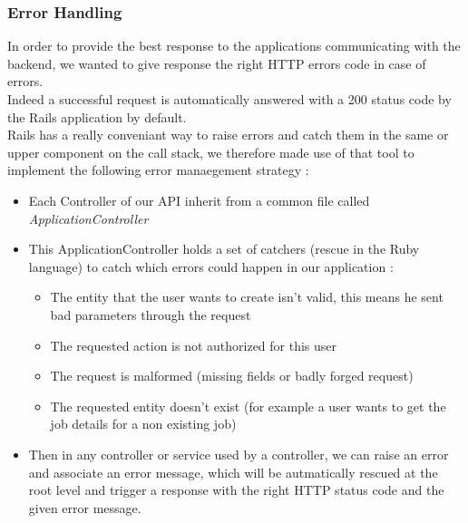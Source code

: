 \documentclass{eplmastersthesis}
\begin{document}
        \subsubsection{Error Handling}

          In order to provide the best response to the applications
          communicating with the backend, we wanted to give response
          the right HTTP errors code in case of errors.\\

          Indeed a successful request is automatically answered with a 200
          status code by the Rails application by default.\\
          Rails has a really conveniant way to raise errors and catch them
          in the same or upper component on the call stack, we therefore
          made use of that tool to implement the following error manaegement
          strategy :

          \begin{itemize}
            \item Each Controller of our API inherit from a common file
            called \textit{ApplicationController}
            \item This ApplicationController holds a set of catchers (rescue
            in the Ruby language) to catch which errors could happen in our
            application :
              \begin{itemize}
                \item The entity that the user wants to create isn't valid, this
                means he sent bad parameters through the request
                \item The requested action is not authorized for this user
                \item The request is malformed (missing fields or badly forged
                request)
                \item The requested entity doesn't exist (for example a user
                wants to get the job details for a non existing job)
              \end{itemize}
            \item Then in any controller or service used by a controller, we
            can raise an error and associate an error message, which will be
            autmatically rescued at the root level and trigger a response with
            the right HTTP status code and the given error message.
          \end{itemize}
\end{document}
